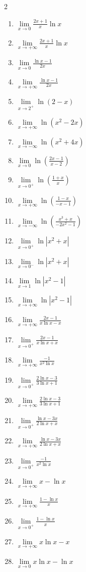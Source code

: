 \documentclass[12pt,a4paper]{article}
\begin{document}
\begin{multicols}{2}
\begin{enumerate}
\item $\lim\limits_{x \to 0} \frac{2x + 1}{x} \ln x $
\item $ \lim\limits_{x \to +\infty} \frac{2x + 1}{x} \ln x  $
\item $ \lim\limits_{x \to 0} \frac{\ln x - 1}{2x} $
\item $ \lim\limits_{x \to +\infty} \frac{\ln x - 1}{2x} $
\item $ \lim\limits_{x \to 2^+} \ln(2 - x)$


\item $ \lim\limits_{x \to +\infty} \ln(x^2 - 2x) $
\item $ \lim\limits_{x \to -\infty} \ln(x^2 + 4x) $
\item $ \lim\limits_{x \to 0} \ln\left(\frac{2x - 1}{x - 2}\right) $
\item $ \lim\limits_{x \to 0^+} \ln\left(\frac{1 + x}{x}\right) $



\item $ \lim\limits_{x \to +\infty} \ln\left(\frac{1 - x}{-x - 1}\right) $
\item $ \lim\limits_{x \to -\infty} \ln\left(\frac{x^3 + x}{-2x^2 - 1}\right) $
\item $ \lim\limits_{x \to 0^+} \ln|x^2 + x| $
\item $ \lim\limits_{x \to 0^-} \ln|x^2 + x| $

\item $ \lim\limits_{x \to 1} \ln|x^2 - 1| $
\item $ \lim\limits_{x \to +\infty} \ln|x^2 - 1| $
\item $ \lim\limits_{x \to +\infty} \frac{2x - 1}{x \ln x - x} $
\item $ \lim\limits_{x \to 0^+} \frac{2x - 1}{x \ln x + x} $
\item $ \lim\limits_{x \to +\infty} \frac{-1}{x^2 \ln x} $

\item $ \lim\limits_{x \to 0^+} \frac{2\ln x - 3}{3\ln x + 1} $
\item $ \lim\limits_{x \to +\infty} \frac{2\ln x - 3}{3\ln x + 1} $
\item $ \lim\limits_{x \to 0^+} \frac{\ln x - 3x}{2\ln x + x} $
\item $ \lim\limits_{x \to +\infty} \frac{\ln x - 3x}{2\ln x + x} $
\item $ \lim\limits_{x \to 0^+} \frac{-1}{x^2 \ln x} $


\item $ \lim\limits_{x \to +\infty} x - \ln x $
\item $ \lim\limits_{x \to +\infty} \frac{1 - \ln x}{x} $ 
\item $ \lim\limits_{x \to 0^+} \frac{1 - \ln x}{x} $
\item $ \lim\limits_{x \to +\infty} x \ln x - x $ 
\item $ \lim\limits_{x \to 0} x \ln x - \ln x $


\end{enumerate}
\end{multicols}
\end{document}
